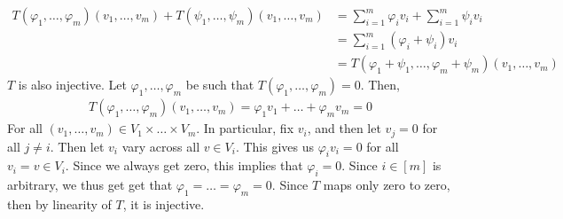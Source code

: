 \documentclass{book}
\begin{document}
\begin{enumerate}[label=\arabic*)]
      \begin{align*}
        T(\varphi_1, \dots, \varphi_m)(v_1, \dots, v_m) + T(\psi_1, \dots, \psi_m)(v_1, \dots, v_m) & = \sum_{i = 1}^{m}\varphi_iv_i + \sum_{i = 1}^{m}\psi_iv_i \\
        & = \sum_{i = 1}^{m}(\varphi_i + \psi_i)v_i \\
        & = T(\varphi_1 + \psi_1, \dots, \varphi_m + \psi_m)(v_1, \dots, v_m)
      \end{align*}
      $T$ is also injective. Let $\varphi_1, \dots, \varphi_m$ be such that $T(\varphi_1, \dots, \varphi_m) = 0$. Then,
      \begin{align*}
        T(\varphi_1, \dots, \varphi_m)(v_1, \dots, v_m) = \varphi_1v_1 + \dots + \varphi_mv_m = 0
      \end{align*}
      For all $(v_1, \dots, v_m) \in V_1\times\dots\times V_m$. In particular, fix $v_i$, and then let $v_j = 0$ for all $j \neq i$. Then let $v_i$ vary across all $v \in V_i$. This gives us
      $\varphi_iv_i = 0$ for all $v_i = v \in V_i$. Since we always get zero, this implies that $\varphi_i = 0$. Since $i \in [m]$ is arbitrary, we thus get get that $\varphi_1 = \dots =
      \varphi_m = 0$. Since $T$ maps only zero to zero, then by linearity of $T$, it is injective.


\end{enumerate}
\end{document}
